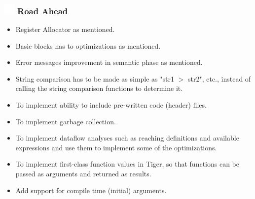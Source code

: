 \documentclass{beamer}
\newcommand{\ft}[1]{
  \frametitle{\includegraphics[height=0.55cm, width=0.55cm, keepaspectratio]{assets/tiger.png} #1}
}
\begin{document}
\begin{frame}[fragile]
  \ft{Road Ahead}
  \begin{itemize}
    \item Register Allocator as mentioned.
    \item Basic blocks has to optimizations as mentioned.
    \item Error messages improvement in semantic phase as mentioned.
    \item String comparison has to be made as simple as "str1 $>$ str2", etc.,  instead of calling the string comparison functions to determine it.
    \item To implement ability to include pre-written code (header) files.
    \item To implement garbage collection.
    \item To implement dataflow analyses such as reaching definitions and available expressions and use them to implement some of the optimizations. 
    \item To implement first-class function values in Tiger, so that functions can be passed as arguments and returned as results.
    \item Add support for compile time (initial) arguments.
  \end{itemize}
\end{frame}
\end{document}
